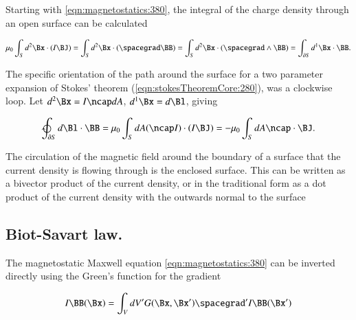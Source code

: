 Starting with
\cref{eqn:magnetostatics:380}, the
integral of the
charge density through an open surface can be calculated

\begin{dmath}\label{eqn:magnetostatics:720}
\mu_0 \int_S d^2 \Bx \cdot (I \BJ)
=
\int_S d^2 \Bx \cdot (\spacegrad \BB)
=
\int_S d^2 \Bx \cdot (\spacegrad \wedge \BB)
=
\int_{\partial S} d^1 \Bx \cdot \BB.
\end{dmath}

The specific orientation of the path around the surface for a two parameter expansion of Stokes' theorem (\cref{eqn:stokesTheoremCore:280}), was a clockwise loop.  Let
\( d^2 \Bx = I \ncap dA \), \( d^1 \Bx = d\Bl \), giving

\begin{dmath}\label{eqn:magnetostatics:740}
\ointclockwise_{\partial S} d\Bl \cdot \BB
= \mu_0 \int_S dA (\ncap I) \cdot (I \BJ)
= -\mu_0 \int_S dA \ncap \cdot \BJ.
\end{dmath}

The circulation of the magnetic field around the boundary of a surface that the current density is flowing through is the enclosed surface.  This can be written as a bivector product of the current density, or in the traditional form as a dot product of the current density with the outwards normal to the surface



\subsection{Biot-Savart law.}

The magnetostatic Maxwell equation \cref{eqn:magnetostatics:380} can be inverted directly using the Green's function for the gradient

\begin{dmath}\label{eqn:biotSavartGreens:40}
I \BB(\Bx)
= \int_V dV' G(\Bx, \Bx') \spacegrad' I \BB(\Bx')
\end{dmath}

